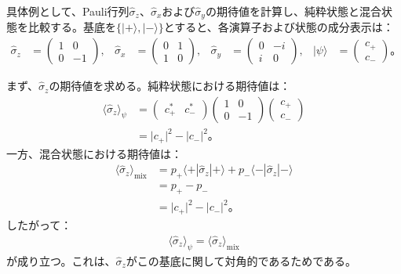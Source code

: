 \documentclass[platex,dvipdfmx,a4paper]{jsarticle}
\begin{document}
具体例として、Pauli行列$\hat{\sigma}_z$、$\hat{\sigma}_x$および$\hat{\sigma}_y$の期待値を計算し、純粋状態と混合状態を比較する。基底を$\{\lvert+\rangle,\lvert-\rangle\}$とすると、各演算子および状態の成分表示は：
\begin{align*}
  \hat{\sigma}_z
  &=
  \begin{pmatrix}
    1 & 0 \\
    0 & -1
  \end{pmatrix},
  &
  \hat{\sigma}_x
  &=
  \begin{pmatrix}
    0 & 1 \\
    1 & 0
  \end{pmatrix},
  &
  \hat{\sigma}_y
  &=
  \begin{pmatrix}
    0 & -i \\
    i & 0
  \end{pmatrix},
  &
  \lvert\psi\rangle
  &=
  \begin{pmatrix}
    c_+ \\
    c_-
  \end{pmatrix}。
\end{align*}

まず、$\hat{\sigma}_z$の期待値を求める。純粋状態における期待値は：
\begin{align*}
  \langle\hat{\sigma}_z\rangle_\psi
  &=
  \begin{pmatrix}
    c_+^* & c_-^*
  \end{pmatrix}
  \begin{pmatrix}
    1 & 0 \\
    0 & -1
  \end{pmatrix}
  \begin{pmatrix}
    c_+ \\
    c_-
  \end{pmatrix} \\
  &=\lvert c_+\rvert^2-\lvert c_-\rvert^2。
\end{align*}
一方、混合状態における期待値は：
\begin{align*}
  \langle\hat{\sigma}_z\rangle_{\mathrm{mix}}
  &=p_+\langle+|\hat{\sigma}_z|+\rangle
    +p_-\langle-|\hat{\sigma}_z|-\rangle \\
  &=p_+-p_- \\
  &=\lvert c_+\rvert^2-\lvert c_-\rvert^2。
\end{align*}
したがって：
\begin{align*}
  \langle\hat{\sigma}_z\rangle_\psi
  =\langle\hat{\sigma}_z\rangle_{\mathrm{mix}}
\end{align*}
が成り立つ。これは、$\hat{\sigma}_z$がこの基底に関して対角的であるためである。
\end{document}
